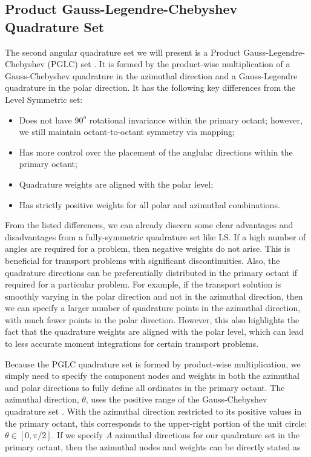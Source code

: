 \subsection{Product Gauss-Legendre-Chebyshev Quadrature Set}
\label{sec::Sn_Angle_PGLC}

The second angular quadrature set we will present is a Product Gauss-Legendre-Chebyshev (PGLC) set \cite{abu1977compatible}. It is formed by the product-wise multiplication of a Gauss-Chebyshev quadrature in the azimuthal direction and a Gauss-Legendre quadrature in the polar direction. It has the following key differences from the Level Symmetric set:

\begin{itemize}
	\item Does not have $90^o$ rotational invariance within the primary octant; however, we still maintain octant-to-octant symmetry via mapping;
	\item Has more control over the placement of the anglular directions within the primary octant;
	\item Quadrature weights are aligned with the polar level;
	\item Has strictly positive weights for all polar and azimuthal combinations.
\end{itemize}

From the listed differences, we can already discern some clear advantages and disadvantages from a fully-symmetric quadrature set like LS. If a high number of angles are required for a problem, then negative weights do not arise. This is beneficial for transport problems with significant discontinuities. Also, the quadrature directions can be preferentially distributed in the primary octant if required for a particular problem. For example, if the transport solution is smoothly varying in the polar direction and not in the azimuthal direction, then we can specify a larger number of quadrature points in the azimuthal direction, with much fewer points in the polar direction. However, this also highlights the fact that the quadrature weights are aligned with the polar level, which can lead to less accurate moment integrations for certain transport problems. 

Because the PGLC quadrature set is formed by product-wise multiplication, we simply need to specify the component nodes and weights in both the azimuthal and polar directions to fully define all ordinates in the primary octant. The azimuthal direction, $\theta$, uses the positive range of the Gauss-Chebyshev quadrature set \cite{abramowitz1966handbook}. With the azimuthal direction restricted to its positive values in the primary octant, this corresponds to the upper-right portion of the unit circle: $\theta \in [0, \pi / 2]$. If we specify $A$ azimuthal directions for our quadrature set in the primary octant, then the azimuthal nodes and weights can be directly stated as 

